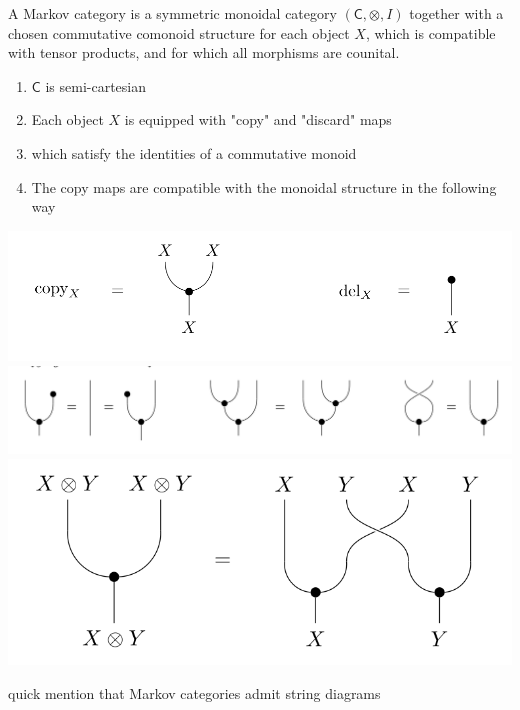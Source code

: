 \begin{frame}
    \begin{definition}
        A Markov category is a symmetric monoidal category $(\mathsf{C}, \otimes, I)$ together with a chosen commutative comonoid structure for each object $X$, which is compatible with tensor products, and for which all morphisms are counital.
    \end{definition}
    \begin{minipage}{.48\textwidth}
        \begin{enumerate}
            \item $\mathsf{C}$ is semi-cartesian
            \item Each object $X$ is equipped with "copy" and "discard" maps
            \item which satisfy the identities of a commutative monoid
            \item The copy maps are compatible with the monoidal structure in the following way
        \end{enumerate}
    \end{minipage}
    \hfill
    \begin{minipage}{.48\textwidth}
        \includegraphics[width=\textwidth]{graphics/string/markov_copy_delete.png}
        \includegraphics[width=\textwidth]{graphics/string/markov_commutative_monoid.png}
        \includegraphics[width=\textwidth]{graphics/string/markov_monoidal_compat.png}
    \end{minipage}
\end{frame}

\begin{frame}
    quick mention that Markov categories admit string diagrams
\end{frame}
